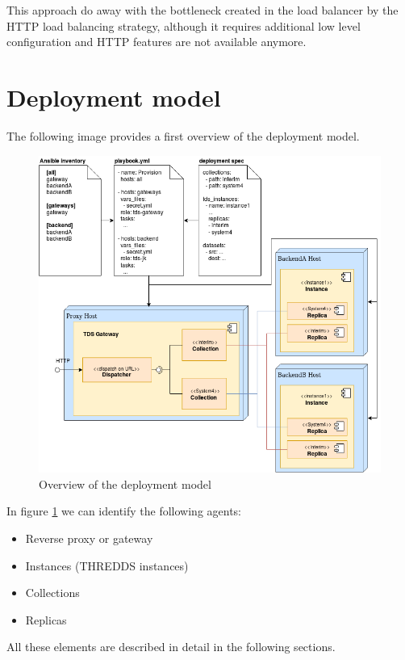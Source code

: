 \documentclass[a4paper,12pt]{article}
\begin{document}
This approach do away with the bottleneck created in the load balancer by the HTTP load balancing strategy, although it requires additional low level configuration and HTTP features are not available anymore.

\section{Deployment model}

The following image provides a first overview of the deployment model.

\begin{figure}[H]
\centering
\includegraphics[width=1\textwidth]{images/overview.png}
\caption{Overview of the deployment model}
\label{fig:model}
\end{figure}

In figure \ref{fig:model} we can identify the following agents:

\begin{itemize}
\item Reverse proxy or gateway
\item Instances (THREDDS instances)
\item Collections
\item Replicas
\end{itemize}

All these elements are described in detail in the following sections.
\end{document}
